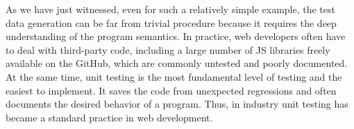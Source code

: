 As we have just witnessed, even for such a relatively simple example, the test data generation can be far from trivial procedure because it requires the deep understanding of the program semantics. In practice, web developers often have to deal with third-party code, including a large number of JS libraries freely available on the GitHub, which are commonly untested and poorly documented. At the same time, unit testing is the most fundamental level of testing and the easiest to implement. It saves the code from unexpected regressions and often documents the desired behavior of a program. Thus, in industry unit testing has became a standard practice in web development.
